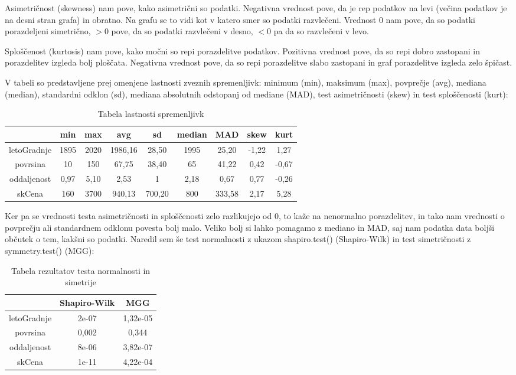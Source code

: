 \documentclass[a4paper, 12pt]{article}
\begin{document}
Asimetričnost (skewness) nam pove, kako asimetrični so podatki. Negativna
vrednost pove, da je rep podatkov na levi (večina podatkov je na desni stran
grafa) in obratno. Na grafu se to vidi kot v katero smer so podatki razvlečeni.
Vrednost $ 0 $ nam pove, da so podatki porazdeljeni simetrično, $ >0 $ pove, da
so podatki razvlečeni v desno, $ <0 $ pa da so razvlečeni v levo.

Sploščenost (kurtosis) nam pove, kako močni so repi porazdelitve podatkov.
Pozitivna vrednost pove, da so repi dobro zastopani in porazdelitev izgleda
bolj ploščata. Negativna vrednost pove, da so repi porazdelitve slabo zastopani
in graf porazdelitve izgleda zelo špičast.

V tabeli so predstavljene prej omenjene lastnosti zveznih spremenljivk:
minimum (min), maksimum (max), povprečje (avg), mediana (median),
standardni odklon (sd), mediana absolutnih odstopanj od mediane (MAD), test
asimetričnosti (skew) in test sploščenosti (kurt):
\begin{table}[H]
\begin{center}
\caption{Tabela lastnosti spremenljivk}
\label{table:2}
\begin{tabular}{ c|cccccccc }
	& min & max & avg & sd & median & MAD & skew & kurt \\
	\hline
	letoGradnje & 1895 & 2020 & 1986,16 & 28,50 & 1995 & 25,20 & -1,22 & 1,27 \\
	povrsina & 10 & 150 & 67,75 & 38,40 & 65 & 41,22 & 0,42 & -0,67 \\
	oddaljenost & 0,97 & 5,10 & 2,53 & 1 & 2,18 & 0,67 & 0,77 & -0,26 \\
	skCena & 160 & 3700 & 940,13 & 700,20 & 800 & 333,58 & 2,17 & 5,28 \\
\end{tabular}
\end{center}
\end{table}

Ker pa se vrednosti testa asimetričnosti in sploščenosti zelo razlikujejo
od $ 0 $, to kaže na nenormalno porazdelitev, in tako nam vrednosti o povprečju
ali standardnem odklonu povesta bolj malo. Veliko bolj si lahko pomagamo z
mediano in MAD, saj nam podatka data boljši občutek o tem, kakšni so podatki.
Naredil sem še test normalnosti z ukazom {\sf shapiro.test()} (Shapiro-Wilk)
in test simetričnosti z {\sf symmetry.test()} (MGG):

\begin{table}[H]
\begin{center}
\caption{Tabela rezultatov testa normalnosti in simetrije}
\label{table:3}
\begin{tabular}{ c|c|c }
	& Shapiro-Wilk & MGG \\
	\hline
	letoGradnje & 2e-07 & 1,32e-05 \\
	povrsina & 0,002 & 0,344 \\
	oddaljenost & 8e-06 & 3,82e-07 \\
	skCena & 1e-11 & 4,22e-04 \\
\end{tabular}
\end{center}
\end{table}
\end{document}
